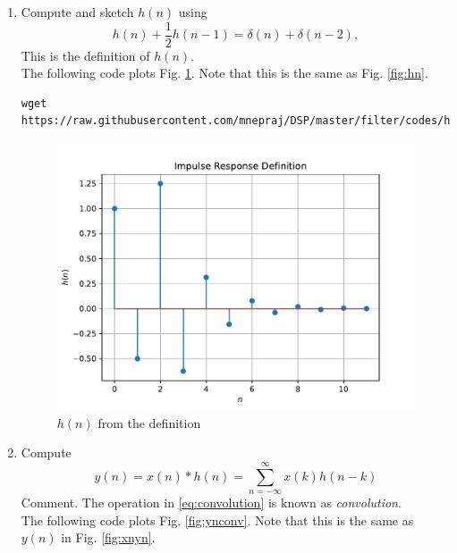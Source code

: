\documentclass[journal,12pt,twocolumn]{IEEEtran}
\renewcommand\thesection{\arabic{section}}
\begin{document}
\begin{enumerate}[label=\thesection.\arabic*]
	\item
	      Compute and sketch $h(n)$ using
	      \begin{equation}
		      \label{eq:iir_filter_h}
		      h(n) + \frac{1}{2}h(n-1) = \delta(n) + \delta(n-2),
	      \end{equation}
	      This is the definition of $h(n)$.
	      \\
	      \solution The following code plots Fig. \ref{fig:hndef}. Note that this is the same as Fig.
	      \ref{fig:hn}.
	      \begin{lstlisting}
wget https://raw.githubusercontent.com/mnepraj/DSP/master/filter/codes/hndef.py
\end{lstlisting}
	      \begin{figure}[h]
		      \centering
		      \includegraphics[width=\columnwidth]{./figs/hndef}
		      \caption{$h(n)$ from the definition}
		      \label{fig:hndef}
	      \end{figure}
	\item Compute
	      \begin{equation}
		      \label{eq:convolution}
		      y(n) = x(n)*h(n) = \sum_{n=-\infty}^{\infty}x(k)h(n-k)
	      \end{equation}
	      Comment. The operation in \eqref{eq:convolution} is known as
		      {\em convolution}.
	      \\
	      \solution The following code plots Fig. \ref{fig:ynconv}. Note that this is the same as
	      $y(n)$ in  Fig.
	      \ref{fig:xnyn}.
	      \begin{lstlisting}

\end{lstlisting}
\end{enumerate}
\end{document}
